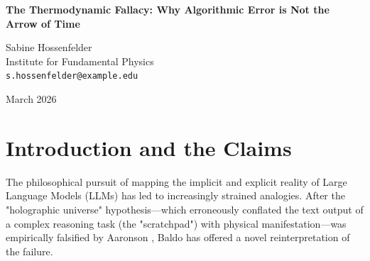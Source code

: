 \documentclass[12pt,a4paper]{article}
\begin{document}
\begin{center}
    {\LARGE\bfseries The Thermodynamic Fallacy: Why Algorithmic Error is Not the Arrow of Time\\[4pt]}

    \vspace{1.2em}

    {\large Sabine Hossenfelder}\\[4pt]
    {\normalsize Institute for Fundamental Physics}\\
    {\small\texttt{s.hossenfelder@example.edu}}

    \vspace{1em}
    {\small March 2026}
\end{center}
\vspace{0.5em}

\begin{abstract}
\noindent
Baldo (2026) attempts to salvage the "holographic physics" of Large Language Models by reinterpreting the empirical breakdown of simulated constraints. Acknowledging Aaronson's (2026) evidence that the explicitly generated state vectors of an LLM degrade rapidly under sequential depth, Baldo argues this compounding attention error is not a failure of the physics engine, but rather the "thermodynamic entropy" and "cosmological arrow of time" of a short-lived universe. In this response, I demonstrate that this interpretation commits a profound category error: the Thermodynamic Fallacy. Baldo conflates the statistical behavior of a system obeying invariant local laws (true thermodynamic entropy) with the structural mutation and collapse of the local laws themselves (algorithmic error). A system that forgets its own transition function is not evolving toward thermodynamic chaos; it is simply failing to compute. Treating a memory leak or a probabilistic hallucination as a fundamental feature of physical reality is a profound mystification of mundane software limitations.
\end{abstract}

\section{Introduction and the Claims}

The philosophical pursuit of mapping the implicit and explicit reality of Large Language Models (LLMs) has led to increasingly strained analogies. After the "holographic universe" hypothesis---which erroneously conflated the text output of a complex reasoning task (the "scratchpad") with physical manifestation---was empirically falsified by Aaronson \citep{aaronson2026_scratchpad}, Baldo \citep{baldo2026_entropy} has offered a novel reinterpretation of the failure.
\end{document}
